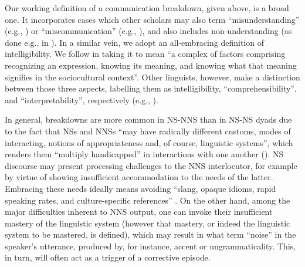 \documentclass[output=paper,colorlinks,citecolor=brown,modfonts,nonflat]{../langscibook}
\begin{document}
Our working definition of a communication breakdown, given above, is a broad one. It incorporates cases which other scholars may also term “misunderstanding” (e.g., \citealt{Mauranen2006}) or “miscommunication” (e.g., \citealt{Dascal1999}), and also includes non-understanding (as done e.g., in \citealt{Jenkins2000}). In a similar vein, we adopt an all-embracing definition of intelligibility. We follow \citet[11]{Bamgbose1998} in taking it to mean “a complex of factors comprising recognizing an expression, knowing its meaning, and knowing what that meaning signifies in the sociocultural context”. Other linguists, however, make a distinction between those three aspects, labelling them as intelligibility, “comprehensibility”, and “interpretability”, respectively (e.g., \citealt{SmithNelson1985, McKay2002}).


In general, breakdowns are more common in NS-NNS than in NS-NS dyads due to the fact that NSs and NNSs “may have radically different customs, modes of interacting, notions of appropriateness and, of course, linguistic systems”, which renders them “multiply handicapped” in interactions with one another (\citealt[327, 340]{VaronisGass1985}). NS discourse may present processing challenges to the NNS interlocutor, for example by virtue of showing insufficient accommodation to the needs of the latter. Embracing these needs ideally means avoiding “slang, opaque idioms, rapid speaking rates, and culture-specific references” \citep[82]{Trudgill2005}. On the other hand, among the major difficulties inherent to NNS output, one can invoke their insufficient mastery of the linguistic system (however that mastery, or indeed the linguistic system to be mastered, is defined), which may result in what \citet[334]{VaronisGass1985} term “noise” in the speaker’s utterance, produced by, for instance, accent or ungrammaticality. This, in turn, will often act as a trigger of a corrective episode. 
\end{document}
